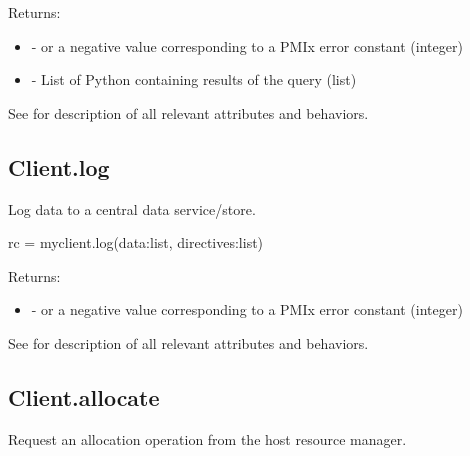 Returns:

\begin{itemize}
    \item {} -  or a negative value corresponding to a PMIx error constant (integer)
    \item {} - List of Python  containing results of the query (list)
\end{itemize}

See  for description of all relevant attributes and behaviors.


\subsection{Client.log}

\summary

Log data to a central data service/store.

\format

\pyspecificstart
\begin{codepar}
rc = myclient.log(data:list, directives:list)
\end{codepar}
\pyspecificend

\begin{arglist}
\end{arglist}

Returns:

\begin{itemize}
    \item {} -  or a negative value corresponding to a PMIx error constant (integer)
\end{itemize}

See  for description of all relevant attributes and behaviors.


\subsection{Client.allocate}

\summary

Request an allocation operation from the host resource manager.

